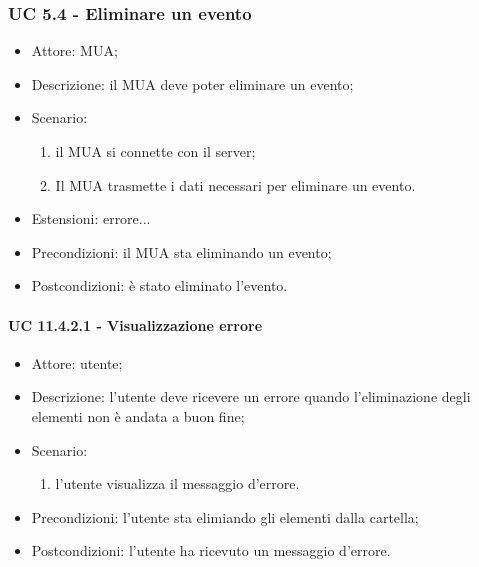     \subsubsection{UC 5.4 - Eliminare un evento} \label{sec: UC 5.4}
    \begin{itemize}
        \item Attore: MUA;
        \item Descrizione: il MUA deve poter eliminare un evento;
        \item Scenario:
        \begin{enumerate}
        \item il MUA si connette con il server;
        \item Il MUA trasmette i dati necessari per eliminare un evento.
        \end{enumerate}
        \item Estensioni: errore...
        \item Precondizioni: il MUA sta eliminando un evento;
        \item Postcondizioni: è stato eliminato l'evento.
    \end{itemize}



    
    \paragraph{UC 11.4.2.1 - Visualizzazione errore} \label{sec: UC 11.4.2.1}
    \begin{itemize}
        \item Attore: utente;
        \item Descrizione: l'utente deve ricevere un errore quando l'eliminazione degli elementi non è andata a buon fine;
        \item Scenario:
        \begin{enumerate}
        \item l'utente visualizza il messaggio d'errore.
        \end{enumerate}   
        \item Precondizioni: l'utente sta elimiando gli elementi dalla cartella;
        \item Postcondizioni: l'utente ha ricevuto un messaggio d'errore.
    \end{itemize}


    

    
   

    
